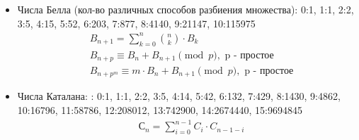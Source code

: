 \documentclass[10pt]{article}
\begin{document}
\begin{itemize}
\begin{longtable}[c]{llllllll}
\end{longtable}
\item Числа Белла (кол-во различных способов разбиения множества): 0:1, 1:1, 2:2, 3:5, 4:15, 5:52, 6:203, 7:877, 8:4140, 9:21147, 10:115975\\
\begin{equation}
  \begin{split}
    &B_{n + 1} = \sum\limits_{k = 0}^n\binom{n}{k} \cdot B_k\\
    &B_{n + p} \equiv B_n + B_{n + 1}\pmod{p}, \text{ p - простое}\\
    &B_{n + p^m} \equiv m \cdot B_n + B_{n + 1}\pmod{p}, \text{ p - простое}
  \end{split}
\end{equation}

\item Числа Каталана: : 0:1, 1:1, 2:2, 3:5, 4:14, 5:42, 6:132, 7:429, 8:1430, 9:4862, 10:16796, 11:58786, 12:208012, 13:742900,
14:2674440, 15:9694845
\begin{equation}
  \begin{split}
    &С_{n} = \sum\limits_{i = 0}^{n - 1}C_i \cdot C_{n - 1 - i}\\
  \end{split}
\end{equation}

\end{itemize}
\end{document}
